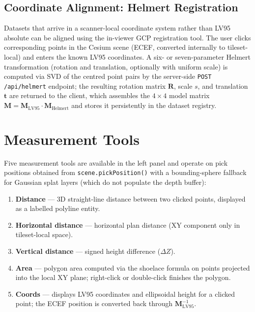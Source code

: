 \subsection{Coordinate Alignment: Helmert Registration}

Datasets that arrive in a scanner-local coordinate system rather than LV95
absolute can be aligned using the in-viewer GCP registration tool. The user
clicks corresponding points in the Cesium scene (ECEF, converted internally to
tileset-local) and enters the known LV95 coordinates. A six- or seven-parameter Helmert transformation (rotation and translation,
optionally with uniform scale) is computed via SVD of the centred point pairs
by the server-side \texttt{POST /api/helmert} endpoint; the resulting
rotation matrix $\mathbf{R}$, scale $s$, and translation $\mathbf{t}$ are
returned to the client, which assembles the $4 \times 4$ model matrix
$\mathbf{M} = \mathbf{M}_{\text{LV95}} \cdot \mathbf{M}_{\text{Helmert}}$
and stores it persistently in the dataset registry.

\section{Measurement Tools}
\label{sec:measurement}

Five measurement tools are available in the left panel and operate on pick
positions obtained from \texttt{scene.pickPosition()} with a bounding-sphere
fallback for Gaussian splat layers (which do not populate the depth buffer):

\begin{enumerate}
  \item \textbf{Distance} — 3D straight-line distance between two clicked
    points, displayed as a labelled polyline entity.
  \item \textbf{Horizontal distance} — horizontal plan distance (XY component
    only in tileset-local space).
  \item \textbf{Vertical distance} — signed height difference ($\Delta Z$).
  \item \textbf{Area} — polygon area computed via the shoelace formula on
    points projected into the local XY plane; right-click or double-click
    finishes the polygon.
  \item \textbf{Coords} — displays LV95 coordinates and ellipsoidal height for
    a clicked point; the ECEF position is converted back through
    $\mathbf{M}_{\text{LV95}}^{-1}$.
\end{enumerate}

